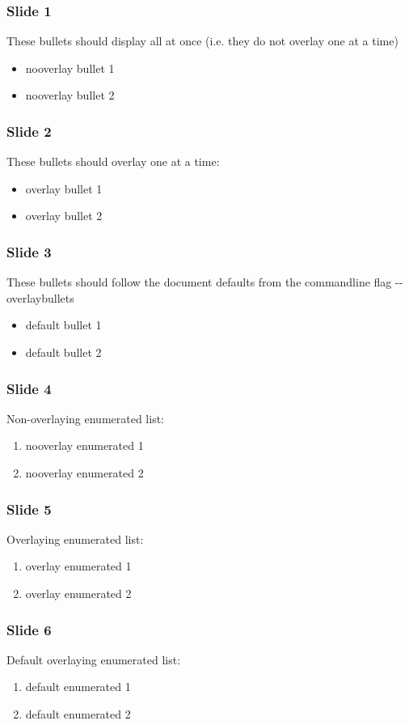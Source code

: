\begin{frame}[fragile]
\frametitle{Slide 1}


These bullets should display all at once (i.e. they do not overlay one
at a time)
\begin{itemize}

\item nooverlay bullet 1

\item nooverlay bullet 2
\end{itemize}
\end{frame}

\begin{frame}[fragile]
\frametitle{Slide 2}


These bullets should overlay one at a time:
\begin{itemize}[<+-| alert@+>]

\item overlay bullet 1

\item overlay bullet 2
\end{itemize}
\end{frame}

\begin{frame}[fragile]
\frametitle{Slide 3}


These bullets should follow the document defaults from the commandline
flag -{}-overlaybullets
\begin{itemize}[<+-| alert@+>]

\item default bullet 1

\item default bullet 2
\end{itemize}
\end{frame}

\begin{frame}[fragile]
\frametitle{Slide 4}


Non-overlaying enumerated list:
\begin{enumerate}

\item nooverlay enumerated 1

\item nooverlay enumerated 2
\end{enumerate}
\end{frame}

\begin{frame}[fragile]
\frametitle{Slide 5}


Overlaying enumerated list:
\begin{enumerate}[<+-| alert@+>]

\item overlay enumerated 1

\item overlay enumerated 2
\end{enumerate}
\end{frame}

\begin{frame}[fragile]
\frametitle{Slide 6}


Default overlaying enumerated list:
\begin{enumerate}[<+-| alert@+>]

\item default enumerated 1

\item default enumerated 2
\end{enumerate}
\end{frame}